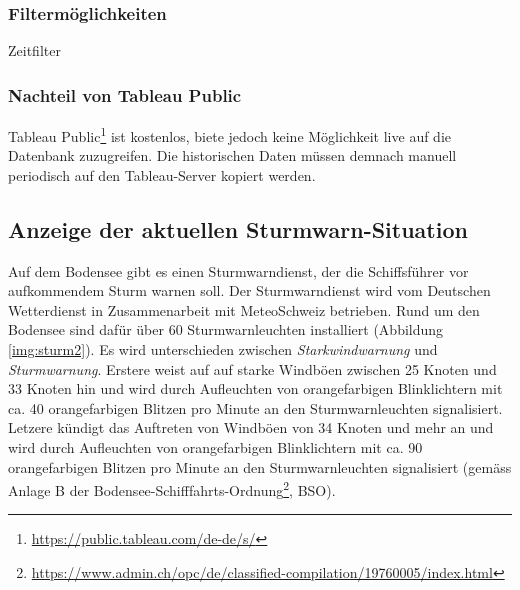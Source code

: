 \subsubsection{Filtermöglichkeiten}
Zeitfilter


\subsubsection{Nachteil von Tableau Public}
Tableau Public\footnote{ \url{https://public.tableau.com/de-de/s/}} ist kostenlos, biete jedoch keine Möglichkeit live auf die Datenbank zuzugreifen. Die historischen Daten müssen demnach manuell periodisch auf den Tableau-Server kopiert werden.\newline

\newline
{}\newline
{}\newline

\newline
{}\newline



\subsection{Anzeige der aktuellen Sturmwarn-Situation}
\label{subsec:sturmwarnung}

Auf dem Bodensee gibt es einen Sturmwarndienst, der die Schiffsführer vor aufkommendem Sturm warnen soll. Der Sturmwarndienst wird vom Deutschen Wetterdienst in Zusammenarbeit mit MeteoSchweiz betrieben. Rund um den Bodensee sind dafür über 60 Sturmwarnleuchten installiert (Abbildung \ref{img:sturm2}). Es wird unterschieden zwischen \textit{Starkwindwarnung} und \textit{Sturmwarnung}. Erstere weist auf auf starke Windböen zwischen 25 Knoten und 33 Knoten hin und wird durch Aufleuchten von orangefarbigen Blinklichtern mit ca. 40 orangefarbigen Blitzen pro Minute an den Sturmwarnleuchten signalisiert. Letzere kündigt das Auftreten von Windböen von 34 Knoten und mehr an und wird durch Aufleuchten von orangefarbigen Blinklichtern mit ca. 90 orangefarbigen Blitzen pro Minute an den Sturmwarnleuchten signalisiert (gemäss Anlage B der Bodensee-Schifffahrts-Ordnung\footnote{ \url{https://www.admin.ch/opc/de/classified-compilation/19760005/index.html}}, BSO).

